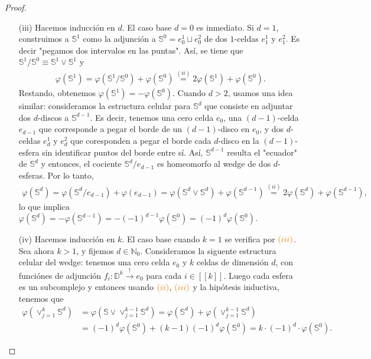 \documentclass[11pt]{article}
\newcommand{\N}{\mathbb{N}}
\newcommand{\D}{\mathbb{D}}
\newcommand{\Ss}{\mathbb{S}}
\newcommand{\nat}[1]{[\![#1]\!]}
\newcommand{\paint}[1]{\color{color}{#1}}
\begin{document}
\begin{proof}
\begin{itemize}
\item[(iii)] Hacemos inducci\'on en $d$. El caso base $d = 0$ es inmediato. Si $d = 1$, construimos a $\Ss^1$ como la adjunci\'on a $\Ss^0 = e_0^1 \sqcup e_0^2$ de dos $1$-celdas $e_1^1$ y $e_1^2$. Es decir "pegamos dos intervalos en las puntas". As\'i, se tiene que $\Ss^1/\Ss^0 \equiv \Ss^1 \vee \Ss^1$ y
\begin{align*}
\varphi(\Ss^1) = \varphi(\Ss^1/\Ss^0) + \varphi(\Ss^0) \stackrel{(ii)}{=} 2\varphi(\Ss^1) + \varphi(\Ss^0).
\end{align*}
Restando, obtenemos $\varphi(\Ss^1) = -\varphi(\Ss^0)$. Cuando $d >2$, usamos una idea similar: consideramos la estructura celular para $\Ss^d$ que consiste en adjuntar dos $d$-discos a $\Ss^{d-1}$. Es decir, tenemos una cero celda $e_0$, una $(d-1)$-celda $e_{d-1}$ que corresponde a pegar el borde de un $(d-1)$-disco en $e_0$, y dos $d$-celdas $e_d^1$ y $e_d^2$ que coresponden a pegar el borde cada $d$-disco en la $(d-1)$-esfera sin identificar puntos del borde entre s\'i. As\'i, $\Ss^{d-1}$ resulta el "ecuador" de $\Ss^{d}$ y entonces, el cociente $\Ss^d/e_{d-1}$ es homeomorfo al wedge de dos $d$-esferas. Por lo tanto, 
\begin{align*}
\varphi(\Ss^d) = \varphi(\Ss^d/e_{d-1}) + \varphi(e_{d-1}) = \varphi(\Ss^d \vee \Ss^d) + \varphi(\Ss^{d-1}) \stackrel{(ii)}{=} 2\varphi(\Ss^d) + \varphi(\Ss^{d-1}),
\end{align*}
lo que implica $\varphi(\Ss^d) = - \varphi(\Ss^{d-1}) = -(-1)^{d-1}\varphi(\Ss^0) = (-1)^d\varphi(\Ss^0)$.
\item[(iv)] Hacemos inducci\'on en $k$. El caso base cuando $k=1$ se verifica por $\paint{(iii)}$. Sea ahora $k  > 1$, y fijemos $d \in \N_0$. Consideramos la siguente estructura celular del wedge: tenemos una cero celda $e_0$ y $k$ celdas de dimensi\'on $d$, con funci\'ones de adjunci\'on $f_i : \D^k \xrightarrow{!} e_0$ para cada $i \in \nat{k}$. Luego cada esfera es un subcomplejo y entonces usando $\paint{(ii)}$, $\paint{(iii)}$ y la hip\'otesis inductiva, tenemos que
\begin{align*}
\varphi(\vee_{j =1}^k\Ss^d) &= \varphi(\Ss \vee \vee_{j =1}^{k-1}\Ss^d) = \varphi(\Ss^d) + \varphi(\vee_{j =1}^{k-1}\Ss^d) \\
&= (-1)^d\varphi(\Ss^0) + (k-1)(-1)^d\varphi(\Ss^0) = k \cdot (-1)^d \cdot \varphi(\Ss^0).
\end{align*}
\end{itemize}
\end{proof}
\newpage
\end{document}
